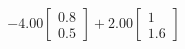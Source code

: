 \documentclass[preview]{standalone}
\begin{document}
\begin{align*}
-4.00 \begin{bmatrix} 0.8 \\ 0.5 \end{bmatrix} + 2.00 \begin{bmatrix} 1 \\ 1.6 \end{bmatrix}
\end{align*}
\end{document}
